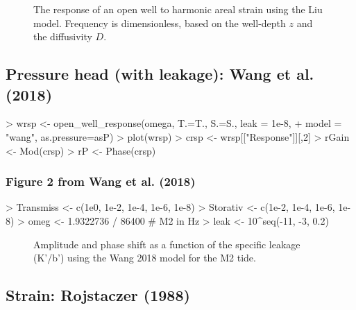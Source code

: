 \documentclass[12pt]{article}
\begin{document}
\begin{figure}[htb!]
\begin{center}
\caption{The response of an open well to harmonic areal strain using
the Liu model. 
Frequency is dimensionless, based on the well-depth $z$ and the diffusivity $D$.
}
\label{fig:owrsp-liu}
\end{center}
\end{figure}



\clearpage
\subsection{Pressure head (with leakage): Wang et al. (2018)}

\begin{Schunk}
\begin{Sinput}
> wrsp <- open_well_response(omega, T.=T., S.=S., leak = 1e-8,
+                            model = "wang", as.pressure=asP)
> plot(wrsp)
> crsp <- wrsp[["Response"]][,2]
> rGain <- Mod(crsp)
> rP <- Phase(crsp)
\end{Sinput}
\end{Schunk}

\clearpage
\subsubsection{Figure 2 from Wang et al. (2018)}

\begin{Schunk}
\begin{Sinput}
> Transmiss <- c(1e0, 1e-2, 1e-4, 1e-6, 1e-8)
> Storativ  <- c(1e-2, 1e-4, 1e-6, 1e-8)
> omeg      <- 1.9322736 / 86400 # M2 in Hz
> leak      <- 10^seq(-11, -3, 0.2)
\end{Sinput}
\end{Schunk}

\begin{figure}[htb!]
\begin{center}
\caption{Amplitude and phase shift as a function of the specific leakage (K'/b') using the Wang 2018 model for the M2 tide.}
\label{fig:owrsp-wang}
\end{center}
\end{figure}



\clearpage
\subsection{Strain: Rojstaczer (1988)}
\end{document}
